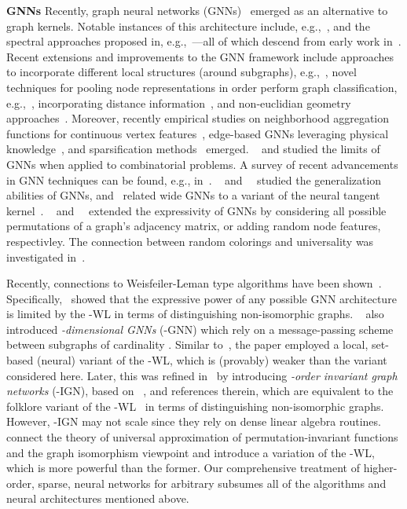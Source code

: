 \documentclass{article}
\newcommand{\xhdr}[1]{{\noindent\bfseries #1}}
\theoremstyle{definition}
\newcommand{\wl}{-\textsf{WL}\xspace}
\newcommand{\kwl}{-\textsf{WL}\xspace}
\newcommand{\kgnn}{\textrm{-}\textsf{GNN}\xspace}
\newcommand{\kign}{\textrm{-}\textsf{IGN}\xspace}
\begin{document}
\xhdr{GNNs}
Recently, graph neural networks (GNNs)~\cite{Gil+2017,Sca+2009} emerged as an alternative to graph kernels. Notable instances of this architecture include, e.g.,~\cite{Duv+2015,Fey+2018,Ham+2017,Vel+2018}, and the spectral approaches proposed in, e.g.,~\cite{Bru+2014,Def+2015,Kip+2017,Mon+2017}---all of which descend from early work in~\cite{Kir+1995,Mer+2005,Spe+1997,Sca+2009}. Recent extensions and improvements to the GNN framework include approaches to incorporate different local structures (around subgraphs), e.g.,~\cite{Hai+2019,Fla+2020,Jin+2020,Nie+2016,Xu+2018}, novel techniques for pooling node representations in order perform graph classification, e.g.,~\cite{Can+2018,Gao+2019,Yin+2018,Zha+2018}, incorporating distance information~\cite{You+2019}, and non-euclidian geometry approaches~\cite{Cha+2019}. Moreover, recently empirical studies on neighborhood aggregation functions for continuous vertex features~\cite{Cor+2020}, edge-based GNNs leveraging physical knowledge~\cite{And+2019,Kli+2020}, and sparsification methods~\cite{Ron+2020} emerged. \citeauthor{Loukas20}~\cite{Loukas20} and \citeauthor{Sat+2019} studied the limits of GNNs when applied to combinatorial problems. A survey of recent advancements in GNN techniques can be found, e.g., in~\cite{Cha+2020,Wu+2019,Zho+2018}. \citeauthor{Gar+2020}~\cite{Gar+2020} and~\citeauthor{Ver+2019}~\cite{Ver+2019} studied the generalization abilities of GNNs, and~\cite{Du+2019} related wide GNNs to a variant of the neural tangent kernel~\cite{Aro+2019,Jac+2020}. \citeauthor{Mur+2019}~\cite{Mur+2019a,Mur+2019} and~\citeauthor{Sat+2020}~\cite{Sat+2020} extended the expressivity of GNNs by considering all possible permutations of a graph’s adjacency matrix, or adding random node features, respectivley. The connection between random colorings and universality was investigated in~\cite{Das+2020}.

Recently, connections to Weisfeiler-Leman type algorithms have been shown~\cite{Bar+2020,Che+2019,Gee+2020a,Gee+2020b,Mae+2019,Mar+2019,Mor+2019,Xu+2018b}. Specifically,~\cite{Mor+2019,Xu+2018b} showed that the expressive power of any possible GNN architecture is limited by the \wl in terms of distinguishing non-isomorphic graphs. \citeauthor{Mor+2019}~\cite{Mor+2019} also introduced \emph{-dimensional GNNs} (\kgnn) which rely on a message-passing scheme between subgraphs of cardinality . Similar to~\cite{Mor+2017}, the paper employed a local, set-based (neural) variant of the \kwl, which is (provably) weaker than the variant considered here. Later, this was refined in~\cite{Mar+2019} by introducing \emph{-order invariant graph networks} (\kign), based on \citeauthor{Mar+2019b}~\cite{Mar+2019b}, and references therein, which are equivalent to the folklore variant of the \kwl~\cite{Gro2017} in terms of distinguishing non-isomorphic graphs. However, \kign may not scale since they rely on dense linear algebra routines. \citeauthor{Che+2019}~\cite{Che+2019} connect the theory of universal approximation of permutation-invariant functions and the graph isomorphism viewpoint and introduce a variation of the -\textsf{WL}, which is more powerful than the former. Our comprehensive treatment of higher-order, sparse, neural networks for arbitrary  subsumes all of the algorithms and neural architectures mentioned above.
\end{document}
